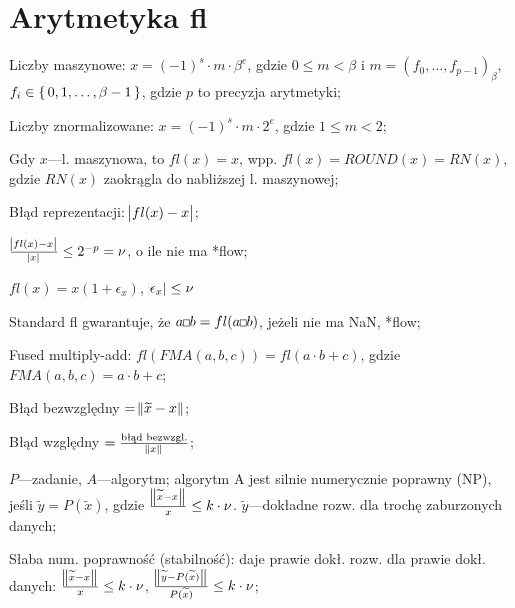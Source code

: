 \section{Arytmetyka fl}

\entry
Liczby maszynowe: $x=(-1)^s \cdot m \cdot \beta^e$, gdzie $0\leq m < \beta$ i $m=(f_0, \ldots, f_{p-1})_\beta$, $f_i\in\set{0,1,\ldots,\beta-1}$, gdzie $p$ to precyzja arytmetyki;

\entry
Liczby znormalizowane: $x=(-1)^s\cdot m \cdot 2^e$, gdzie $1\leq m < 2$;

\entry
Gdy $x$---l. maszynowa, to $fl(x)=x$, wpp. $fl(x)=ROUND(x)=RN(x)$, gdzie $RN(x)$ zaokrągla do nabliższej l. maszynowej;

\entry
Błąd reprezentacji: $\abs{fl(x) - x}$;

\entry
$\frac{\abs{fl(x) - x}}{\abs{x}}\leq 2^{-p}=\nu$, o ile nie ma *flow;

\entry
$fl(x) = x(1+\epsilon_x)$, $\abs{\epsilon_x}\leq \nu$

\entry
Standard fl gwarantuje, że $a \Hsquare b = fl(a\Hsquare b)$, jeżeli nie ma NaN, *flow;

\entry
Fused multiply-add: $fl(FMA(a,b,c)) = fl(a \cdot b + c)$, gdzie $FMA(a,b,c)=a\cdot b + c$;


\entry
Błąd bezwzględny $=\norm{\widetilde{x} - x}$;

\entry
Błąd względny $=\frac{\text{błąd bezwzgl.}}{\norm{x}}$;

\entry
$P$---zadanie, $A$---algorytm; algorytm A jest silnie numerycznie poprawny (NP), jeśli $\widetilde{y} = P(\widetilde{x})$, gdzie $\frac{\norm{\widetilde{x}-x}}{x}\leq k\cdot\nu$. $\widetilde{y}$---dokładne rozw. dla trochę zaburzonych danych;

\entry
Słaba num. poprawność (stabilność): daje prawie dokł. rozw. dla prawie dokł. danych: $\frac{\norm{\widetilde{x}-x}}{x}\leq k\cdot\nu$, $\frac{\norm{\widetilde{y}-P(\widetilde{x})}}{P(\widetilde{x})}\leq k\cdot\nu$;
